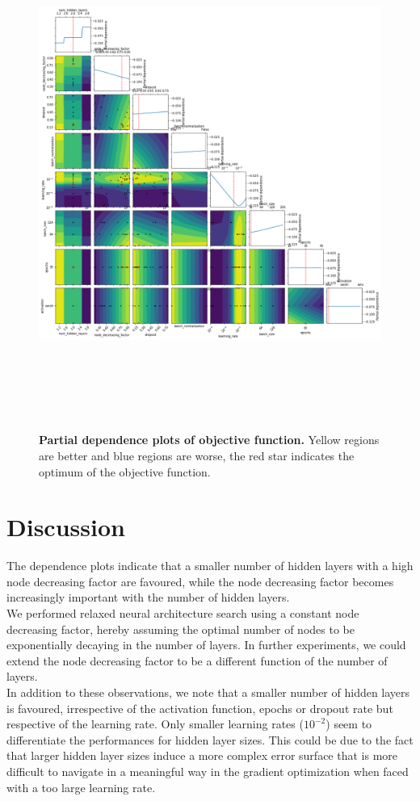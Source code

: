\documentclass[bsc,frontabs,twoside,singlespacing,parskip,deptreport]{infthesis}     %
\let\Oldsection\section
\renewcommand{\section}{\FloatBarrier\Oldsection}
\begin{document}
\begin{figure}[h!]
\centering
\caption{\textbf{Partial dependence plots of objective function.} Yellow regions are better and blue regions are worse, the red star indicates the optimum of the objective function.}
\includegraphics[height=16cm]{images/bo_objective.png}\label{bo_obj}
\end{figure}
\section{Discussion}
The dependence plots indicate that a smaller number of hidden layers with a high node decreasing factor are favoured, while the node decreasing factor becomes increasingly important with the number of hidden layers.\\
We performed relaxed neural architecture search using a constant node decreasing factor, hereby assuming the optimal number of nodes to be exponentially decaying in the number of layers. In further experiments, we could extend the node decreasing factor to be a different function of the number of layers.\\
In addition to these observations, we note that a smaller number of hidden layers is favoured, irrespective of the activation function, epochs or dropout rate but respective of the learning rate. Only smaller learning rates (\(10^{-2}\)) seem to differentiate the performances for hidden layer sizes. This could be due to the fact that larger hidden layer sizes induce a more complex error surface that is more difficult to navigate in a meaningful way in the gradient optimization when faced with a too large learning rate. \\
\end{document}
